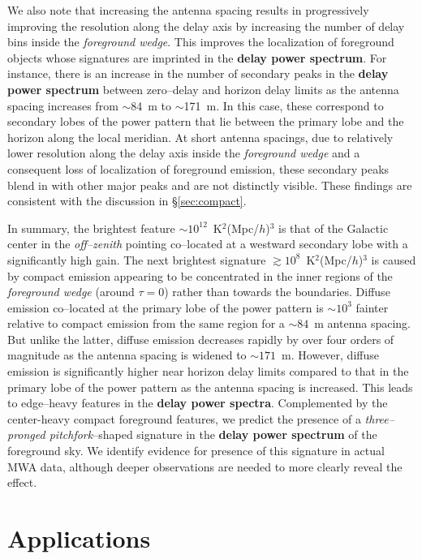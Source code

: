 \documentclass[preprint2,iop,numberedappendix]{emulateapj}
\begin{document}
We also note that increasing the antenna spacing results in progressively improving the resolution along the delay axis by increasing the number of delay bins inside the {\it foreground wedge}. This improves the localization of foreground objects whose signatures are imprinted in the {\bf delay power spectrum}. For instance, there is an increase in the number of secondary peaks in the {\bf delay power spectrum} between zero--delay and horizon delay limits as the antenna spacing increases from $\sim$84~m to $\sim$171~m. In this case, these correspond to secondary lobes of the power pattern that lie between the primary lobe and the horizon along the local meridian. At short antenna spacings, due to relatively lower resolution along the delay axis inside the {\it foreground wedge} and a consequent loss of localization of foreground emission, these secondary peaks blend in with other major peaks and are not distinctly visible. These findings are consistent with the discussion in \S\ref{sec:compact}.

In summary, the brightest feature $\sim 10^{12}$~K$^2$(Mpc/$h$)$^3$ is that of the Galactic center in the {\it off--zenith} pointing co--located at a westward secondary lobe with a significantly high gain. The next brightest signature $\gtrsim 10^8$~K$^2$(Mpc/$h$)$^3$ is caused by compact emission appearing to be concentrated in the inner regions of the {\it foreground wedge} (around $\tau=0$) rather than towards the boundaries. Diffuse emission co--located at the primary lobe of the power pattern is $\sim 10^3$ fainter relative to compact emission from the same region for a $\sim 84$~m antenna spacing. But unlike the latter, diffuse emission decreases rapidly by over four orders of magnitude as the antenna spacing is widened to $\sim 171$~m. However, diffuse emission is significantly higher near horizon delay limits compared to that in the primary lobe of the power pattern as the antenna spacing is increased. This leads to edge--heavy features in the {\bf delay power spectra}. Complemented by the center-heavy compact foreground features, we predict the presence of a {\it three--pronged pitchfork}--shaped signature in the {\bf delay power spectrum} of the foreground sky. We identify evidence for presence of this signature in actual MWA data, although deeper observations are needed to more clearly reveal the effect.

\section{Applications}\label{sec:fg-grading}
\end{document}
